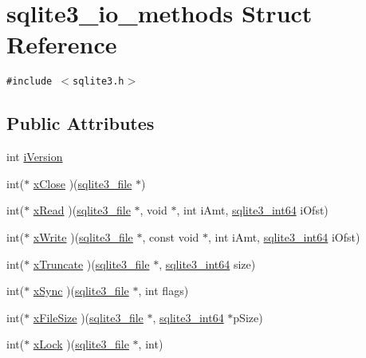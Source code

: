 \hypertarget{structsqlite3__io__methods}{
\section{sqlite3\_\-io\_\-methods Struct Reference}
\label{structsqlite3__io__methods}
}
{\tt \#include $<$sqlite3.h$>$}

\subsection*{Public Attributes}
\begin{CompactItemize}
\item 
int \hyperlink{structsqlite3__io__methods_d1c72bdfde750a09a797f314a096a965}{iVersion}
\item 
int($\ast$ \hyperlink{structsqlite3__io__methods_3c021d16959e0533f507b3212681a22e}{xClose} )(\hyperlink{structsqlite3__file}{sqlite3\_\-file} $\ast$)
\item 
int($\ast$ \hyperlink{structsqlite3__io__methods_19870694752f65e8738d89d871d0ca7f}{xRead} )(\hyperlink{structsqlite3__file}{sqlite3\_\-file} $\ast$, void $\ast$, int iAmt, \hyperlink{sqlite3_8h_0a4d3e6c1ad46f90e746b920ab6ca0d2}{sqlite3\_\-int64} iOfst)
\item 
int($\ast$ \hyperlink{structsqlite3__io__methods_803b39bc86bbff522602597fa4390e0f}{xWrite} )(\hyperlink{structsqlite3__file}{sqlite3\_\-file} $\ast$, const void $\ast$, int iAmt, \hyperlink{sqlite3_8h_0a4d3e6c1ad46f90e746b920ab6ca0d2}{sqlite3\_\-int64} iOfst)
\item 
int($\ast$ \hyperlink{structsqlite3__io__methods_981cc60fc305bfb38eecd7123a513a20}{xTruncate} )(\hyperlink{structsqlite3__file}{sqlite3\_\-file} $\ast$, \hyperlink{sqlite3_8h_0a4d3e6c1ad46f90e746b920ab6ca0d2}{sqlite3\_\-int64} size)
\item 
int($\ast$ \hyperlink{structsqlite3__io__methods_8d39ac02aeb1eb63622008217031b098}{xSync} )(\hyperlink{structsqlite3__file}{sqlite3\_\-file} $\ast$, int flags)
\item 
int($\ast$ \hyperlink{structsqlite3__io__methods_d269e3cbda39d0a2383aef13b60b02f8}{xFileSize} )(\hyperlink{structsqlite3__file}{sqlite3\_\-file} $\ast$, \hyperlink{sqlite3_8h_0a4d3e6c1ad46f90e746b920ab6ca0d2}{sqlite3\_\-int64} $\ast$pSize)
\item 
int($\ast$ \hyperlink{structsqlite3__io__methods_3e4749687788b89ed0f672db7a4f6ac8}{xLock} )(\hyperlink{structsqlite3__file}{sqlite3\_\-file} $\ast$, int)
\item 

\end{CompactItemize}
